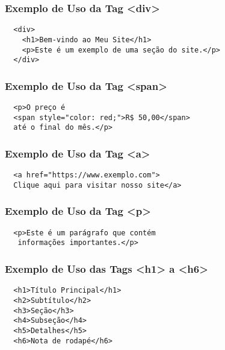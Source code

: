 \documentclass{beamer}
\begin{document}
\begin{frame}[fragile]
  \frametitle{Exemplo de Uso da Tag <div>}
  \begin{verbatim}
  <div>
    <h1>Bem-vindo ao Meu Site</h1>
    <p>Este é um exemplo de uma seção do site.</p>
  </div>
  \end{verbatim}
\end{frame}

\begin{frame}[fragile]
  \frametitle{Exemplo de Uso da Tag <span>}
  \begin{verbatim}
  <p>O preço é 
  <span style="color: red;">R$ 50,00</span> 
  até o final do mês.</p>
  \end{verbatim}
\end{frame}

\begin{frame}[fragile]
  \frametitle{Exemplo de Uso da Tag <a>}
  \begin{verbatim}
  <a href="https://www.exemplo.com">
  Clique aqui para visitar nosso site</a>
  \end{verbatim}
\end{frame}

\begin{frame}[fragile]
  \frametitle{Exemplo de Uso da Tag <p>}
  \begin{verbatim}
  <p>Este é um parágrafo que contém
   informações importantes.</p>
  \end{verbatim}
\end{frame}

\begin{frame}[fragile]
  \frametitle{Exemplo de Uso das Tags <h1> a <h6>}
  \begin{verbatim}
  <h1>Título Principal</h1>
  <h2>Subtítulo</h2>
  <h3>Seção</h3>
  <h4>Subseção</h4>
  <h5>Detalhes</h5>
  <h6>Nota de rodapé</h6>
  \end{verbatim}
\end{frame}
\end{document}
